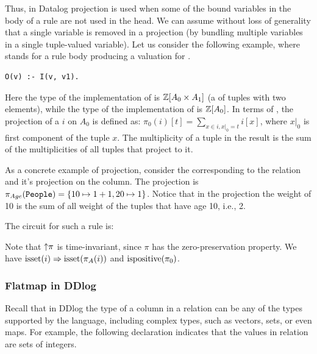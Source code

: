 Thus, in Datalog projection is used when some of the bound variables
in the body of a rule are not used in the head.  We can assume without loss of
generality that a single variable is removed in a projection (by bundling multiple
variables in a single tuple-valued variable).
Let us consider the following example, where  stands for a rule body producing
a valuation for .

\begin{lstlisting}[language=ddlog]
O(v) :- I(v, v1).
\end{lstlisting}

Here the type of the implementation of  is $\mathbb{Z}[A_0 \times A_1]$ (a \zr of tuples with
two elements), while the type of the implementation of  is $\mathbb{Z}[A_0]$.  In terms of \zrs, the
projection of a \zr $i$ on $A_0$ is defined as: $\pi_0(i)[t] = \sum_{x \in i, x|_0 = t} i[x]$,
where $x|_0$ is first component of the tuple $x$.  The multiplicity of a tuple in the result
is the sum of the multiplicities of all tuples that project to it.

As a concrete example of projection, consider the \zr corresponding to the
 relation and it's projection on the  column.
The projection is $\pi_{Age}(\mbox{\texttt{People}}) = \{ 10 \mapsto 1 + 1, 20 \mapsto 1 \}$.
Notice that in the projection the weight of 10 is the sum of all weight of
the tuples that have age 10, i.e., 2.

The circuit for such a rule is:


Note that ${\uparrow}\pi$ is time-invariant, since $\pi$ has the zero-preservation
property.  We have $\mbox{isset}(i) \Rightarrow \mbox{isset}(\pi_A(i))$ and $\mbox{ispositive}(\pi_0)$.

\subsubsection{Flatmap in DDlog}\label{sec:flatmap} 

Recall that in DDlog the type of a column in a relation can be
any of the types supported by the language, including complex types,
such as vectors, sets, or even maps.  For example, the following
declaration indicates that the values in relation  are
sets of integers.

